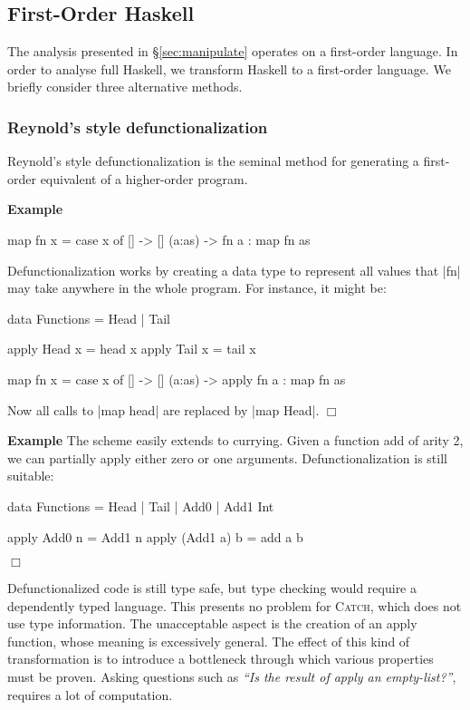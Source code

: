 \documentclass[preprint]{sigplanconf}
\newcommand{\C}[1]{\textsf{#1}}
\newcommand{\catch}{\textsc{Catch}}
\newcounter{exmp}
\newcommand{\yesexample}{\addtocounter{exmp}{1}\addvspace{2mm}\noindent\textbf{Example \arabic{exmp}}}
\newcommand{\noexample}{\hfill$\Box$\par\addvspace{2mm}}
\newenvironment{example}{\yesexample}{\noexample}
\begin{document}
\subsection{First-Order Haskell}

The analysis presented in \S\ref{sec:manipulate} operates on a first-order language. In order to analyse full Haskell, we transform Haskell to a first-order language. We briefly consider three alternative methods.

\subsubsection{Reynold's style defunctionalization}

Reynold's style defunctionalization \citep{reynolds:defunc} is the seminal method for generating a first-order equivalent of a higher-order program.

\begin{example}
\begin{code}
map fn x = case  x of
                 []      -> []
                 (a:as)  -> fn a : map fn as
\end{code}

Defunctionalization works by creating a data type to represent all values that |fn| may take anywhere in the whole program. For instance, it might be:

\begin{code}
data Functions = Head | Tail

apply Head  x = head  x
apply Tail  x = tail  x

map fn x = case  x of
                 []      -> []
                 (a:as)  -> apply fn a : map fn as
\end{code}

Now all calls to |map head| are replaced by |map Head|.
\end{example}

\begin{example}
The scheme easily extends to currying. Given a function \C{add} of arity 2, we can partially apply either zero or one arguments. Defunctionalization is still suitable:

\begin{code}
data Functions = Head | Tail | Add0 | Add1 Int

apply Add0      n  = Add1 n
apply (Add1 a)  b  = add a b
\end{code}
\end{example}

Defunctionalized code is still type safe, but type checking would require a dependently typed language. This presents no problem for \catch{}, which does not use type information. The unacceptable aspect is the creation of an \C{apply} function, whose meaning is excessively general. The effect of this kind of transformation is to introduce a bottleneck through which various properties must be proven. Asking questions such as \textit{``Is the result of \C{apply} an empty-list?''}, requires a lot of computation.
\end{document}
